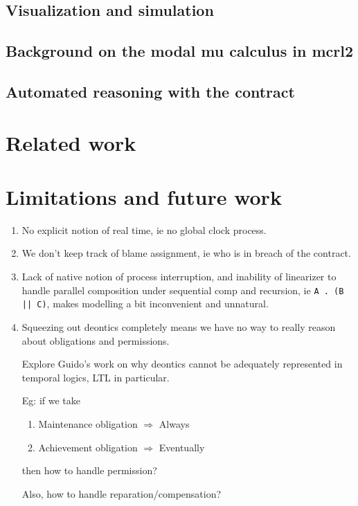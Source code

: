 \documentclass{article}
\begin{document}
\subsection{Visualization and simulation}

\subsection{Background on the modal mu calculus in mcrl2}

\subsection{Automated reasoning with the contract}

\section{Related work}

\section{Limitations and future work}

\begin{enumerate}
  \item No explicit notion of real time, ie no global clock process.

  \item We don't keep track of blame assignment, ie who is in breach of the
  contract.

  \item Lack of native notion of process interruption, and inability of
  linearizer to handle parallel composition under sequential comp and recursion,
  ie \texttt{A . (B || C)}, makes modelling a bit inconvenient and unnatural.

  \item Squeezing out deontics completely means we have no way to really reason
  about obligations and permissions.

  Explore Guido's work on why deontics cannot be adequately represented in
  temporal logics, LTL in particular.

  Eg: if we take
  \begin{enumerate}
    \item Maintenance obligation $\Rightarrow$ Always
    \item Achievement obligation $\Rightarrow$ Eventually
  \end{enumerate}
  then how to handle permission?

  Also, how to handle reparation/compensation?
\end{enumerate}
\end{document}
